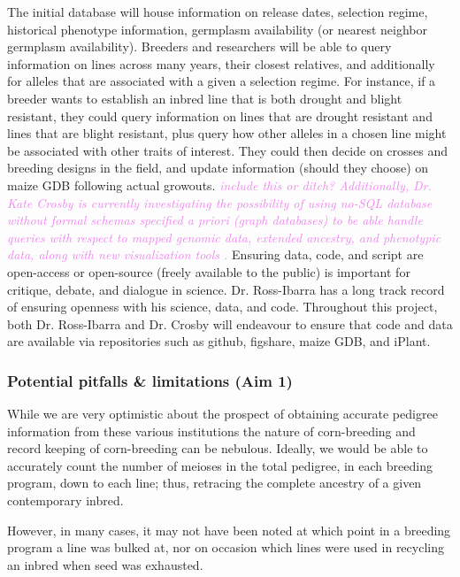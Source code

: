 \documentclass[final,12pt]{article}
\newcommand{\kc}[1]{\textcolor{violet}{ \emph{\scriptsize  #1}} }
\begin{document}
The initial database will house information on release dates, selection regime, historical phenotype information, germplasm availability (or nearest neighbor germplasm availability).
Breeders and researchers will be able to query information on lines across many years, their closest relatives, and additionally for alleles that are associated with a given a selection regime. 
For instance, if a breeder wants to establish an inbred line that is both drought and blight resistant, they could query information on lines that are drought resistant and lines that are blight resistant, plus query how other alleles in a chosen line might be associated with other traits of interest. They could then decide on crosses and breeding designs in the field, and update information (should they choose) on maize GDB following actual growouts.
\kc{include this or ditch? Additionally, Dr. Kate Crosby is currently investigating the possibility of using no-SQL database without formal schemas specified \textit{a priori} (graph databases) to be able handle queries with respect to mapped genomic data, extended ancestry, and phenotypic data, along with new visualization tools \citep{ParejaTobes:2015bf}.}
Ensuring data, code, and script are open-access or open-source (freely available to the public) is important for critique, debate, and dialogue in science. Dr. Ross-Ibarra has a long track record of ensuring openness with his science, data, and code. Throughout this project, both Dr. Ross-Ibarra and Dr. Crosby will endeavour to ensure that code and data are available via repositories such as github, figshare, maize GDB, and iPlant.



\subsubsection*{Potential pitfalls \& limitations (Aim 1)}
While we are very optimistic about the prospect of obtaining accurate pedigree information from these various institutions the nature of corn-breeding and record keeping of corn-breeding can be nebulous. 
Ideally, we would be able to accurately count the number of meioses in the total pedigree, in each breeding program, down to each line; thus, retracing the complete ancestry of a given contemporary inbred. 

However, in many cases, it may not have been noted at which point in a breeding program a line was bulked at, nor on occasion which lines were used in recycling an inbred when seed was exhausted. 
\end{document}
